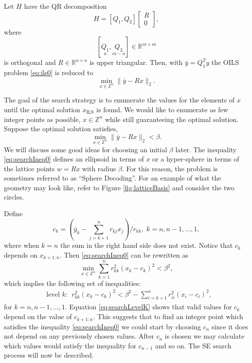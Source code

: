\documentclass[12pt,Bold,letterpaper]{mcgilletdclass}
\newcommand{\bmx}{\begin{bmatrix}}
\newcommand{\emx}{\end{bmatrix}}
\newcommand{\be}{\begin{equation}}
\newcommand{\ee}{\end{equation}}
\newcommand{\by}{{\bar{y}}}
\begin{document}
Let $H$ have the QR decomposition
$$
H=[Q_1, Q_2] \bmx R \\ 0 \emx,
$$
where $$[\underset{n}{Q_1}, \underset{m-n}{Q_2}]  \in \mathbb{R}^{m\times m}$$ is orthogonal
and $R\in \mathbb{R}^{n\times n}$ is upper triangular. 
Then, with $\bar{y}=Q_1^Ty$ the OILS problem \eqref{eq:ils0} is reduced to 
\be 
\label{eq:ils}
\min_{x \in  {\mathbb{Z}^n}}  \| \by- Rx \|_2.
\ee

The goal of the search strategy is to enumerate the values for the elements of $x$ until the optimal solution $x_{\scriptscriptstyle{\mathrm{ILS}}}$ is found. We would like to enumerate as few integer points as possible, $x \in \mathbb{Z}^n$ while still guaranteeing the optimal solution. Suppose the optimal solution satisfies,
\be 
\label{eq:searchIneq0}
\min_{x \in  {\mathbb{Z}^n}}  \| \by- Rx \|_2 < \beta. 
\ee
We will discuss some good ideas for choosing an initial $\beta$ later. The inequality \eqref{eq:searchIneq0} defines an ellipsoid in terms of $x$ or a hyper-sphere in terms of the lattice points $w=Rx$ with radius $\beta$. For this reason, the problem is sometimes referred to as ``Sphere Decoding''. For an example of what the geometry may look like, refer to Figure \ref{fig:latticeBasis} and consider the two circles.

Define
\begin{equation}
 c_k = (\bar{y}_k - \sum_{j=k+1}^nr_{kj}x_j)/r_{kk}, \; k=n, n-1,\ldots, 1,
\label{eq:searchC}
\end{equation}
where when $k=n$ the sum in the right hand side does not exist. Notice that $c_k$ depends on $x_{k+1:n}$.
Then \eqref{eq:searchIneq0} can be rewritten as
\begin{equation}\label{eq:searchIneq1}
\min_{x \in  {\mathbb{Z}^n}} \sum_{k=1}^n r_{kk}^2(x_k-c_k)^2 < \beta^2,
\end{equation}
which implies the following
set of inequalities:
\begin{align}
&\text{level } k: \ \ r_{kk}^2(x_k-c_k)^2 < \beta^2 -\sum_{i=k+1}^nr_{ii}^2(x_i-c_i)^2, \label{eq:searchLevelK}
\end{align}
for $k=n,n-1,\ldots, 1$. Equation \eqref{eq:searchLevelK} shows that valid values for $c_k$ depend on the value of $c_{k+1:n}$. This suggests that to find an integer point which satisfies the inequality \ref{eq:searchIneq0} we could start by choosing $c_n$ since it does not depend on any previously chosen values. After $c_n$ is chosen we may calculate which values would satisfy the inequality for $c_{n-1}$ and so on. The SE search process will now be described.
\end{document}
